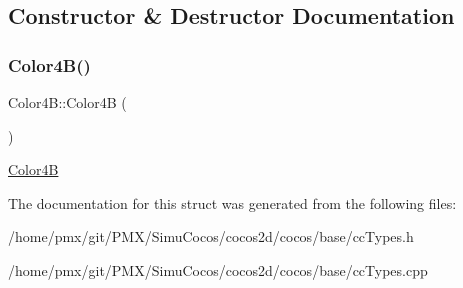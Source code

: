 \subsection{Constructor \& Destructor Documentation}
\mbox{\label{structColor4B_af106d17e3139338bab6db5c64beea8a9}} 
\subsubsection{\texorpdfstring{Color4\+B()}{Color4B()}}
{\footnotesize\ttfamily Color4\+B\+::\+Color4B (\begin{DoxyParamCaption}{ }\end{DoxyParamCaption})}

\hyperlink{structColor4B}{Color4B} 

The documentation for this struct was generated from the following files\+:\begin{DoxyCompactItemize}
\item 
/home/pmx/git/\+P\+M\+X/\+Simu\+Cocos/cocos2d/cocos/base/cc\+Types.\+h\item 
/home/pmx/git/\+P\+M\+X/\+Simu\+Cocos/cocos2d/cocos/base/cc\+Types.\+cpp\end{DoxyCompactItemize}
